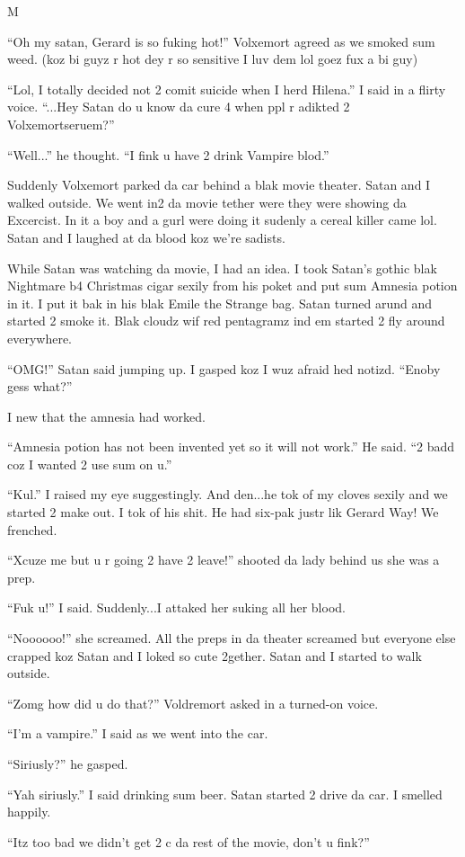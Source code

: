 M\documentclass{article}
\begin{document}
“Oh my satan, Gerard is so fuking hot!” Volxemort agreed as we smoked sum weed. (koz bi guyz r hot dey r so sensitive I luv dem lol goez fux a bi guy)

“Lol, I totally decided not 2 comit suicide when I herd Hilena.” I said in a flirty voice. “...Hey Satan do u know da cure 4 when ppl r adikted 2 Volxemortseruem?”

“Well...” he thought. “I fink u have 2 drink Vampire blod.”

Suddenly Volxemort parked da car behind a blak movie theater. Satan and I walked outside. We went in2 da movie tether were they were showing da Excercist. In it a boy and a gurl were doing it sudenly a cereal killer came lol. Satan and I laughed at da blood koz we’re sadists.

While Satan was watching da movie, I had an idea. I took Satan’s gothic blak Nightmare b4 Christmas cigar sexily from his poket and put sum Amnesia potion in it. I put it bak in his blak Emile the Strange bag. Satan turned arund and started 2 smoke it. Blak cloudz wif red pentagramz ind em started 2 fly around everywhere.

“OMG!” Satan said jumping up. I gasped koz I wuz afraid hed notizd. “Enoby gess what?”

I new that the amnesia had worked.

“Amnesia potion has not been invented yet so it will not work.” He said. “2 badd coz I wanted 2 use sum on u.”

“Kul.” I raised my eye suggestingly. And den...he tok of my cloves sexily and we started 2 make out. I tok of his shit. He had six-pak justr lik Gerard Way! We frenched.

“Xcuze me but u r going 2 have 2 leave!” shooted da lady behind us she was a prep.

“Fuk u!” I said. Suddenly...I attaked her suking all her blood.

“Noooooo!” she screamed. All the preps in da theater screamed but everyone else crapped koz Satan and I loked so cute 2gether. Satan and I started to walk outside.

“Zomg how did u do that?” Voldremort asked in a turned-on voice.

“I’m a vampire.” I said as we went into the car.

“Siriusly?” he gasped.

“Yah siriusly.” I said drinking sum beer. Satan started 2 drive da car. I smelled happily.

“Itz too bad we didn’t get 2 c da rest of the movie, don’t u fink?”
\end{document}
